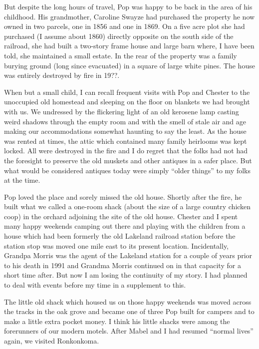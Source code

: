 \documentclass[12pt]{book}              %
\begin{document}
But despite the long hours of travel, Pop was happy to be back in the area of his childhood. His grandmother, Caroline Swayze had purchased the property he now owned in two parcels, one in 1856 and one in 1869. On a five acre plot she had purchased (I assume about 1860) directly opposite on the south side of the railroad, she had built a two-story frame house and large barn where, I have been told, she maintained a small estate. In the rear of the property was a family burying ground (long since evacuated) in a square of large white pines. The house was entirely destroyed by fire in 19??. 

When but a small child, I can recall frequent visits with Pop and Chester to the unoccupied old homestead and sleeping on the floor on blankets we had brought with us. We undressed by the flickering light of an old kerosene lamp casting weird shadows through the empty room and with the smell of stale air and age making our accommodations somewhat haunting to say the least. As the house was rented at times, the attic which contained many family heirlooms was kept locked. All were destroyed in the fire and I do regret that the folks had not had the foresight to preserve the old muskets and other antiques in a safer place. But what would be considered antiques today were simply ``older things'' to my folks at the time.

Pop loved the place and sorely missed the old house. Shortly after the fire, he built what we called a one-room shack (about the size of a large country chicken coop) in the orchard adjoining the site of the old house. Chester and I spent many happy weekends camping out there and playing with the children from a house which had been formerly the old Lakeland railroad station before the station stop was moved one mile east to its present location. Incidentally, Grandpa Morris was the agent of the Lakeland station for a couple of years prior to his death in 1991 and Grandma Morris continued on in that capacity for a short time after. But now I am losing the continuity of my story. I had planned to deal with events before my time in a supplement to this. 

The little old shack which housed us on those happy weekends was moved across the tracks in the oak grove and became one of three Pop built for campers and to make a little extra pocket money. I think his little shacks were among the forerunners of our modern motels. After Mabel and I had resumed ``normal lives'' again, we visited Ronkonkoma. 
\end{document}
